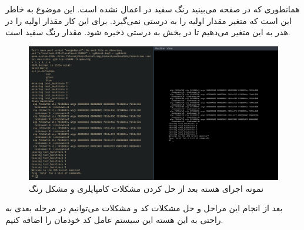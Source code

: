 \documentclass[a4paper, 12pt]{article}
\begin{document}
همانطوری که در صفحه می‌بینید رنگ سفید در
اعمال نشده است.
این موضوع به خاطر این است که متغیر مقدار اولیه را به درستی نمی‌گیرد.
برای این کار مقدار اولیه را در هدر به این متغیر می‌دهیم تا در بخش
به درستی ذخیره شود.
مقدار رنگ سفید
است.
\begin{figure}[H]
    \centering
    \includegraphics[width=1.0\textwidth]{4.png}
    \caption{نمونه اجرای هسته
    بعد از حل کردن مشکلات کامپایلری
    و مشکل رنگ
    }
    \label{fig4:output}
\end{figure}
بعد از انجام این مراحل و حل مشکلات کد و مشکلات
می‌توانیم در مرحله بعدی به راحتی به این هسته این سیستم عامل کد خودمان را اضافه کنیم.
\end{document}
